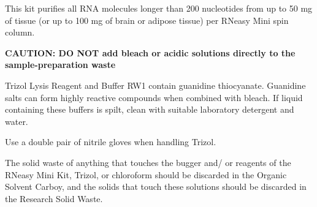 \documentclass[11pt, oneside]{article}
\begin{document}
		\vspace{5mm}
		

		\noindent This kit purifies all RNA molecules longer than 200 nucleotides from up to 50 mg of tissue (or up to 100 mg of brain or adipose tissue) per 		RNeasy Mini spin column. 
		
		\vspace{5mm}
		
		
		\vspace{3mm}
		
		\begin{adjustwidth}{0.5in}{0pt} {\bf CAUTION: DO NOT add bleach or acidic solutions directly to the sample-preparation waste}
		\end{adjustwidth}
		
		\vspace{3mm}
		
		\noindent Trizol Lysis Reagent and Buffer RW1 contain guanidine thiocyanate. Guanidine salts can form highly reactive compounds when 			combined with bleach. If liquid containing these buffers is spilt, clean with suitable laboratory detergent and water.
		
		\vspace{3mm}
		
		\noindent Use a double pair of nitrile gloves when handling Trizol. 
		
		\vspace{3mm}
		
		\noindent The solid waste of anything that touches the bugger and/ or reagents of the RNeasy Mini Kit, Trizol, or chloroform should be discarded in 		the Organic Solvent Carboy, and the solids that touch these solutions should be discarded in the Research Solid Waste.
 
		\vspace{5mm}
		
		
\end{document}
